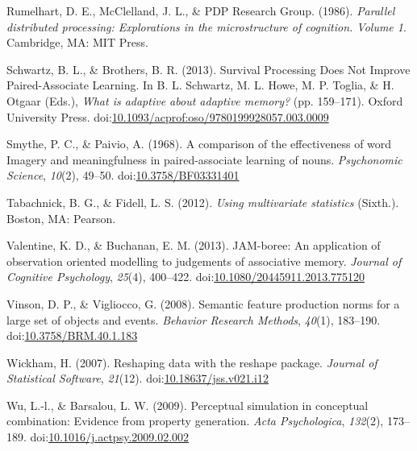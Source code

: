 \documentclass[english,,man]{apa6}
\begin{document}
\leavevmode\hypertarget{ref-Rumelhart1986}{}%
Rumelhart, D. E., McClelland, J. L., \& PDP Research Group. (1986). \emph{Parallel distributed processing: Explorations in the microstructure of cognition. Volume 1}. Cambridge, MA: MIT Press.

\leavevmode\hypertarget{ref-Schwartz2013}{}%
Schwartz, B. L., \& Brothers, B. R. (2013). Survival Processing Does Not Improve Paired-Associate Learning. In B. L. Schwartz, M. L. Howe, M. P. Toglia, \& H. Otgaar (Eds.), \emph{What is adaptive about adaptive memory?} (pp. 159--171). Oxford University Press. doi:\href{https://doi.org/10.1093/acprof:oso/9780199928057.003.0009}{10.1093/acprof:oso/9780199928057.003.0009}

\leavevmode\hypertarget{ref-Smythe1968}{}%
Smythe, P. C., \& Paivio, A. (1968). A comparison of the effectiveness of word Imagery and meaningfulness in paired-associate learning of nouns. \emph{Psychonomic Science}, \emph{10}(2), 49--50. doi:\href{https://doi.org/10.3758/BF03331401}{10.3758/BF03331401}

\leavevmode\hypertarget{ref-Tabachnick2012}{}%
Tabachnick, B. G., \& Fidell, L. S. (2012). \emph{Using multivariate statistics} (Sixth.). Boston, MA: Pearson.

\leavevmode\hypertarget{ref-Valentine2013}{}%
Valentine, K. D., \& Buchanan, E. M. (2013). JAM-boree: An application of observation oriented modelling to judgements of associative memory. \emph{Journal of Cognitive Psychology}, \emph{25}(4), 400--422. doi:\href{https://doi.org/10.1080/20445911.2013.775120}{10.1080/20445911.2013.775120}

\leavevmode\hypertarget{ref-Vinson2008}{}%
Vinson, D. P., \& Vigliocco, G. (2008). Semantic feature production norms for a large set of objects and events. \emph{Behavior Research Methods}, \emph{40}(1), 183--190. doi:\href{https://doi.org/10.3758/BRM.40.1.183}{10.3758/BRM.40.1.183}

\leavevmode\hypertarget{ref-Wickham2007}{}%
Wickham, H. (2007). Reshaping data with the reshape package. \emph{Journal of Statistical Software}, \emph{21}(12). doi:\href{https://doi.org/10.18637/jss.v021.i12}{10.18637/jss.v021.i12}

\leavevmode\hypertarget{ref-Wu2009}{}%
Wu, L.-l., \& Barsalou, L. W. (2009). Perceptual simulation in conceptual combination: Evidence from property generation. \emph{Acta Psychologica}, \emph{132}(2), 173--189. doi:\href{https://doi.org/10.1016/j.actpsy.2009.02.002}{10.1016/j.actpsy.2009.02.002}
\end{document}
